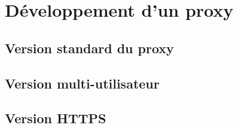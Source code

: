 \section{Développement d'un proxy}

\subsection{Version standard du proxy}

\subsection{Version multi-utilisateur}

\subsection{Version HTTPS}
